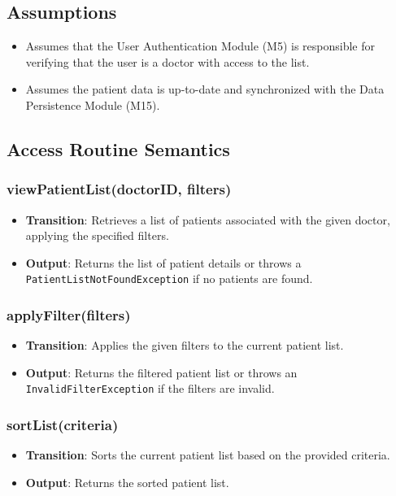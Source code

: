 \documentclass[12pt, titlepage]{article}
\begin{document}
\subsection{Assumptions}
\begin{itemize}
\item Assumes that the User Authentication Module (M5) is responsible for verifying that the user is a doctor with access to the list.
\item Assumes the patient data is up-to-date and synchronized with the Data Persistence Module (M15).
\end{itemize}

\subsection{Access Routine Semantics}
\subsubsection{viewPatientList(doctorID, filters)}

\begin{itemize}
    \item \textbf{Transition}: Retrieves a list of patients associated with the given doctor, applying the specified filters.
    \item \textbf{Output}: Returns the list of patient details or throws a \texttt{PatientListNotFoundException} if no patients are found.
\end{itemize}

\subsubsection{applyFilter(filters)}

\begin{itemize}
    \item \textbf{Transition}: Applies the given filters to the current patient list.
    \item \textbf{Output}: Returns the filtered patient list or throws an \texttt{InvalidFilterException} if the filters are invalid.
\end{itemize}

\subsubsection{sortList(criteria)}

\begin{itemize}
    \item \textbf{Transition}: Sorts the current patient list based on the provided criteria.
    \item \textbf{Output}: Returns the sorted patient list.
\end{itemize}
\end{document}
